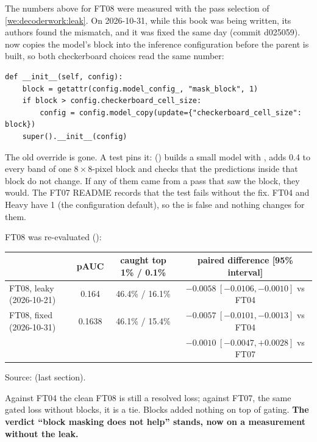 The numbers above for FT08 were measured with the pass selection of \cref{we:decoderwork:leak}. On 2026-10-31,
while this book was being written, its authors found the mismatch, and it was fixed the same day (commit d025059).
 now copies the model's block into the inference configuration before the
parent is built, so both checkerboard choices read the same number:
\begin{lstlisting}
def __init__(self, config):
    block = getattr(config.model_config_, "mask_block", 1)
    if block > config.checkerboard_cell_size:
        config = config.model_copy(update={"checkerboard_cell_size": block})
    super().__init__(config)
\end{lstlisting}
The old  override is gone. A test pins it:
() builds a small model with , adds
0.4 to every band of one $8\times8$-pixel block and checks that the predictions inside that block do not change.
If any of them came from a pass that saw the block, they would. The FT07 README records that the test fails
without the fix. FT04 and Heavy have  1 (the configuration default), so the  is false and
nothing changes for them.

FT08 was re-evaluated ():
\begin{center}\small
\begin{tabular}{lccc}
\toprule
 & pAUC & caught top 1\% / 0.1\% & paired difference [95\% interval]\\
\midrule
FT08, leaky (2026-10-21) & 0.164 & 46.4\% / 16.1\% & $-0.0058\ [-0.0106,-0.0010]$ vs FT04\\
FT08, fixed (2026-10-31) & 0.1638 & 46.1\% / 15.4\% & $-0.0057\ [-0.0101,-0.0013]$ vs FT04\\
 & & & $-0.0010\ [-0.0047,+0.0028]$ vs FT07\\
\bottomrule
\end{tabular}

\smallskip
{\footnotesize Source:  (last section).}
\end{center}
Against FT04 the clean FT08 is still a resolved loss; against FT07, the same gated loss without blocks, it is a
tie. Blocks added nothing on top of gating. \textbf{The verdict ``block masking does not help'' stands, now on a
measurement without the leak.}

